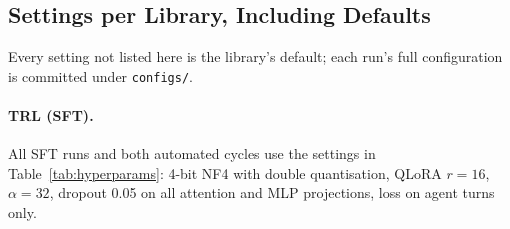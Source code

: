 \documentclass[11pt]{article}
\begin{document}
\begin{table}[t]
\centering
\footnotesize
\setlength{\tabcolsep}{2.8pt}
\caption{Autonomous end-to-end healing cycles from base Aya 32B (Arm P) on one H100 GPU, gated on 36 dev tasks (1 sample, oracle-scored). T/A/L denote mean TOOL, ARG, and LOOP findings/conversation. Cycle 1 and Cycle 2 compare two full operational configurations (co-varying granularity, pool size, deduplication, token volume, and step budget).}
\label{tab:auto_cycles}
\end{table}

\subsection{Settings per Library, Including Defaults}
\label{app:kit_settings}
Every setting not listed here is the library's default; each run's full configuration is committed under \texttt{configs/}.

\paragraph{TRL (SFT).} All SFT runs and both automated cycles use the settings in Table~\ref{tab:hyperparams}: 4-bit NF4 with double quantisation, QLoRA $r=16$, $\alpha=32$, dropout 0.05 on all attention and MLP projections, loss on agent turns only.
\end{document}

